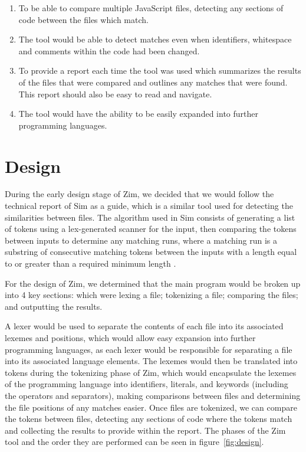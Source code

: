 \documentclass[11pt, a4paper]{article}
\begin{document}
\begin{enumerate}
	\item To be able to compare multiple JavaScript files, detecting any sections of code between the files which match.
	\item The tool would be able to detect matches even when identifiers, whitespace and comments within the code had been changed.
	\item To provide a report each time the tool was used which summarizes the results of the files that were compared and outlines any matches that were found. This report should also be easy to read and navigate.
	\item The tool would have the ability to be easily expanded into further programming languages.
\end{enumerate}

\section{Design}

During the early design stage of Zim, we decided that we would follow the technical report of Sim as a guide, which is a similar tool used for detecting the similarities between files. The algorithm used in Sim consists of generating a list of tokens using a lex-generated scanner for the input, then comparing the tokens between inputs to determine any matching runs, where a matching run is a substring of consecutive matching tokens between the inputs with a length equal to or greater than a required minimum length \cite{techReport}. 

For the design of Zim, we determined that the main program would be broken up into 4 key sections: which were lexing a file; tokenizing a file; comparing the files; and outputting the results. 

A lexer would be used to separate the contents of each file into its associated lexemes and positions, which would allow easy expansion into further programming languages, as each lexer would be responsible for separating a file into its associated language elements.
The lexemes would then be translated into tokens during the tokenizing phase of Zim, which would encapsulate the lexemes of the programming language into identifiers, literals, and keywords (including the operators and separators), making comparisons between files and determining the file positions of any matches easier.
Once files are tokenized, we can compare the tokens between files, detecting any sections of code where the tokens match and collecting the results to provide within the report.
The phases of the Zim tool and the order they are performed can be seen in figure~\ref{fig:design}.
\end{document}

